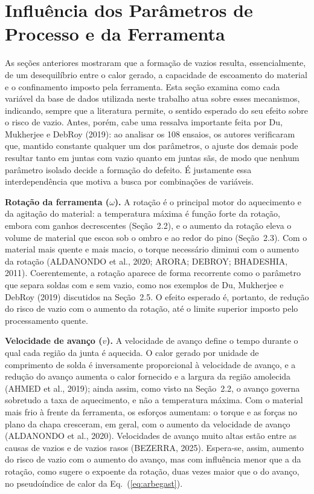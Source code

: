 \documentclass[12pt,openany]{report}
\begin{document}
\section{Influência dos Parâmetros de Processo e da Ferramenta}
\label{sec:parametros}

As seções anteriores mostraram que a formação de vazios resulta, essencialmente, de um desequilíbrio entre o calor gerado, a capacidade de escoamento do material e o confinamento imposto pela ferramenta. Esta seção examina como cada variável da base de dados utilizada neste trabalho atua sobre esses mecanismos, indicando, sempre que a literatura permite, o sentido esperado do seu efeito sobre o risco de vazio. Antes, porém, cabe uma ressalva importante feita por Du, Mukherjee e DebRoy (2019): ao analisar os 108 ensaios, os autores verificaram que, mantido constante qualquer um dos parâmetros, o ajuste dos demais pode resultar tanto em juntas com vazio quanto em juntas sãs, de modo que nenhum parâmetro isolado decide a formação do defeito. É justamente essa interdependência que motiva a busca por combinações de variáveis.

\textbf{Rotação da ferramenta ($\omega$).} A rotação é o principal motor do aquecimento e da agitação do material: a temperatura máxima é função forte da rotação, embora com ganhos decrescentes (Seção~2.2), e o aumento da rotação eleva o volume de material que escoa sob o ombro e ao redor do pino (Seção~2.3). Com o material mais quente e mais macio, o torque necessário diminui com o aumento da rotação (ALDANONDO et al., 2020; ARORA; DEBROY; BHADESHIA, 2011). Coerentemente, a rotação aparece de forma recorrente como o parâmetro que separa soldas com e sem vazio, como nos exemplos de Du, Mukherjee e DebRoy (2019) discutidos na Seção~2.5. O efeito esperado é, portanto, de redução do risco de vazio com o aumento da rotação, até o limite superior imposto pelo processamento quente.

\textbf{Velocidade de avanço ($v$).} A velocidade de avanço define o tempo durante o qual cada região da junta é aquecida. O calor gerado por unidade de comprimento de solda é inversamente proporcional à velocidade de avanço, e a redução do avanço aumenta o calor fornecido e a largura da região amolecida (AHMED et al., 2019); ainda assim, como visto na Seção~2.2, o avanço governa sobretudo a taxa de aquecimento, e não a temperatura máxima. Com o material mais frio à frente da ferramenta, os esforços aumentam: o torque e as forças no plano da chapa cresceram, em geral, com o aumento da velocidade de avanço (ALDANONDO et al., 2020). Velocidades de avanço muito altas estão entre as causas de vazios e de vazios rasos (BEZERRA, 2025). Espera-se, assim, aumento do risco de vazio com o aumento do avanço, mas com influência menor que a da rotação, como sugere o expoente da rotação, duas vezes maior que o do avanço, no pseudoíndice de calor da Eq.~(\ref{eq:arbegast}).
\end{document}
